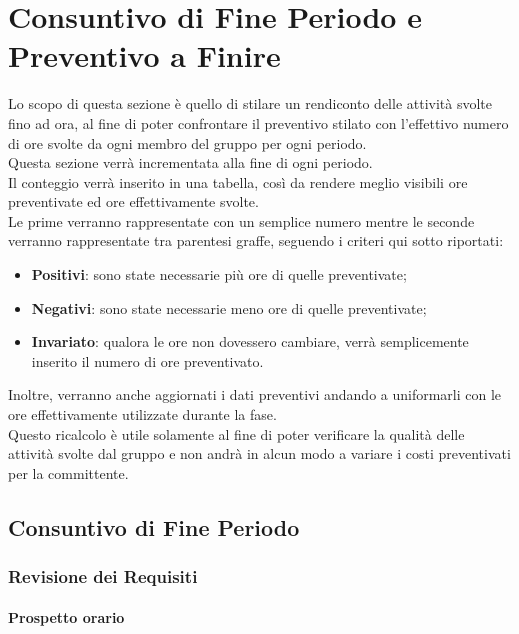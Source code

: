 \section{Consuntivo di Fine Periodo e Preventivo a Finire}
\label{CFPPAF}

Lo scopo di questa sezione è quello di stilare un rendiconto delle attività svolte fino ad ora, al fine di poter confrontare il preventivo stilato con l'effettivo numero di ore svolte da ogni membro del gruppo per ogni periodo.\\
Questa sezione verrà incrementata alla fine di ogni periodo.\\
Il conteggio verrà inserito in una tabella, così da rendere meglio visibili ore preventivate ed ore effettivamente svolte.\\
Le prime verranno rappresentate con un semplice numero mentre le seconde verranno rappresentate tra parentesi graffe, seguendo i criteri qui sotto riportati:
\begin{itemize}
	\item \textbf{Positivi}: sono state necessarie più ore di quelle preventivate;
	\item \textbf{Negativi}: sono state necessarie meno ore di quelle preventivate;
	\item \textbf{Invariato}: qualora le ore non dovessero cambiare, verrà semplicemente inserito il numero di ore preventivato.	
\end{itemize}

Inoltre, verranno anche aggiornati i dati preventivi andando a uniformarli con le ore effettivamente utilizzate durante la fase.\\
Questo ricalcolo è utile solamente al fine di poter verificare la qualità delle attività svolte dal gruppo e non andrà in alcun modo a variare i costi preventivati per la committente.

\newpage

\subsection{Consuntivo di Fine Periodo}
\label{CFP}
\subsubsection{Revisione dei Requisiti}

\paragraph{Prospetto orario} \-\\

